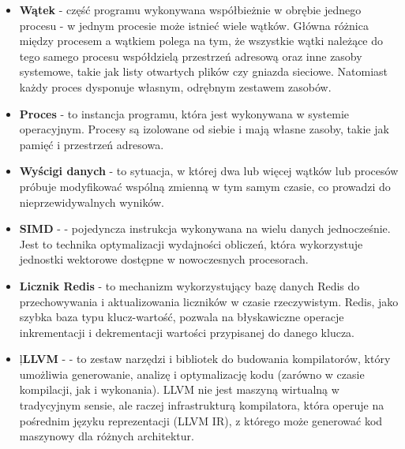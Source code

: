 \begin{itemize}
    \item \textbf{Wątek} - część programu wykonywana współbieżnie w obrębie jednego procesu - w jednym procesie może istnieć wiele wątków. Główna różnica między procesem a wątkiem polega na tym, że wszystkie wątki należące do tego samego procesu współdzielą przestrzeń adresową oraz inne zasoby systemowe, takie jak listy otwartych plików czy gniazda sieciowe. Natomiast każdy proces dysponuje własnym, odrębnym zestawem zasobów.
    \item \textbf{Proces} - to instancja programu, która jest wykonywana w systemie operacyjnym. Procesy są izolowane od siebie i mają własne zasoby, takie jak pamięć i przestrzeń adresowa.
    \item \textbf{Wyścigi danych } - to sytuacja, w której dwa lub więcej wątków lub procesów próbuje modyfikować wspólną zmienną w tym samym czasie, co prowadzi do nieprzewidywalnych wyników.
    \item \textbf{SIMD} -  - pojedyncza instrukcja wykonywana na wielu danych jednocześnie. Jest to technika optymalizacji wydajności obliczeń, która wykorzystuje jednostki wektorowe dostępne w nowoczesnych procesorach.
    \item \textbf{Licznik Redis} - to mechanizm wykorzystujący bazę danych Redis do przechowywania i aktualizowania liczników w czasie rzeczywistym. Redis, jako szybka baza typu klucz-wartość, pozwala na błyskawiczne operacje inkrementacji i dekrementacji wartości przypisanej do danego klucza.
    \item ļ\textbf{LLVM} -  - to zestaw narzędzi i bibliotek do budowania kompilatorów, który umożliwia generowanie, analizę i optymalizację kodu (zarówno w czasie kompilacji, jak i wykonania). LLVM nie jest maszyną wirtualną w tradycyjnym sensie, ale raczej infrastrukturą kompilatora, która operuje na pośrednim języku reprezentacji (LLVM IR), z którego może generować kod maszynowy dla różnych architektur.
\end{itemize}